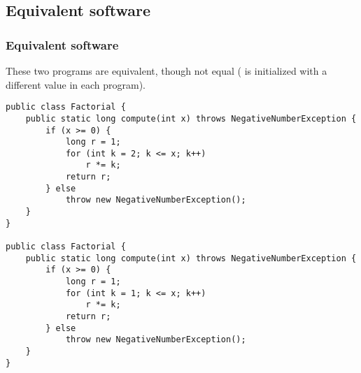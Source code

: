 \subsection*{Equivalent software}
\label{example:limitation-equivalence}


\begin{frame}
\frametitle{Equivalent software}

These two programs are equivalent, though not equal ( is
initialized with a different value in each program).

\begin{lstlisting}
public class Factorial {
    public static long compute(int x) throws NegativeNumberException {
        if (x >= 0) {
            long r = 1;
            for (int k = 2; k <= x; k++) 
                r *= k;
            return r;
        } else 
            throw new NegativeNumberException();
    }
}

public class Factorial {
    public static long compute(int x) throws NegativeNumberException {
        if (x >= 0) {
            long r = 1;
            for (int k = 1; k <= x; k++) 
                r *= k;
            return r;
        } else 
            throw new NegativeNumberException();
    }
}
\end{lstlisting}

\end{frame}

